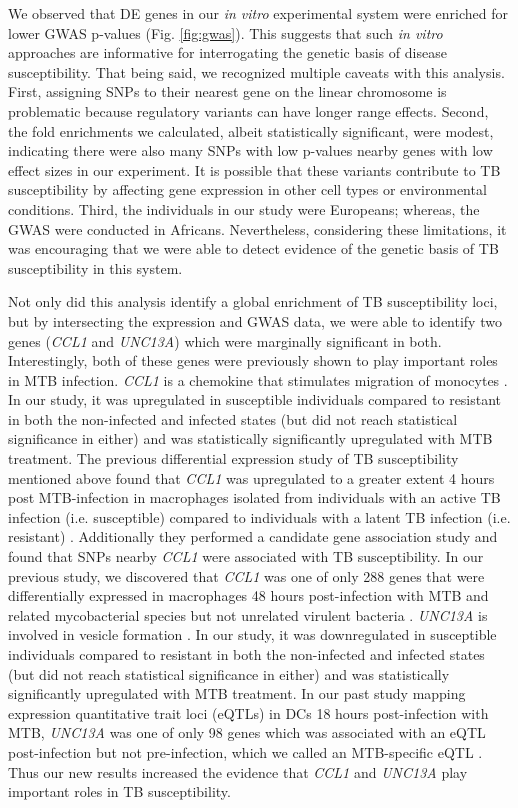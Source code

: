 \documentclass[fleqn,10pt]{wlscirep}
\begin{document}
We observed that DE genes in our \emph{in vitro} experimental system
were enriched for lower GWAS p-values (Fig. \ref{fig:gwas}). This
suggests that such \emph{in vitro} approaches are informative for
interrogating the genetic basis of disease susceptibility. That being
said, we recognized multiple caveats with this analysis. First,
assigning SNPs to their nearest gene on the linear chromosome is
problematic because regulatory variants can have longer range effects.
Second, the fold enrichments we calculated, albeit statistically
significant, were modest, indicating there were also many SNPs with
low p-values nearby genes with low effect sizes in our experiment. It
is possible that these variants contribute to TB susceptibility by
affecting gene expression in other cell types or environmental
conditions. Third, the individuals in our study were Europeans;
whereas, the GWAS were conducted in Africans. Nevertheless,
considering these limitations, it was encouraging that we were able to
detect evidence of the genetic basis of TB susceptibility in this
system.

Not only did this analysis identify a global enrichment of TB
susceptibility loci, but by intersecting the expression and GWAS data,
we were able to identify two genes (\emph{CCL1} and \emph{UNC13A})
which were marginally significant in both. Interestingly, both of
these genes were previously shown to play important roles in MTB
infection. \emph{CCL1} is a chemokine that stimulates migration of
monocytes \cite{Miller1992}. In our study, it was upregulated in
susceptible individuals compared to resistant in both the non-infected
and infected states (but did not reach statistical significance in
either) and was statistically significantly upregulated with MTB
treatment. The previous differential expression study of TB
susceptibility mentioned above found that \emph{CCL1} was upregulated
to a greater extent 4 hours post MTB-infection in macrophages isolated
from individuals with an active TB infection (i.e. susceptible)
compared to individuals with a latent TB infection (i.e. resistant)
\cite{Thuong2008}. Additionally they performed a candidate gene
association study and found that SNPs nearby \emph{CCL1} were
associated with TB susceptibility. In our previous study, we
discovered that \emph{CCL1} was one of only 288 genes that were
differentially expressed in macrophages 48 hours post-infection with
MTB and related mycobacterial species but not unrelated virulent
bacteria \cite{Blischak2015}. \emph{UNC13A} is involved in vesicle
formation \cite{Sudhof2004}. In our study, it was downregulated in
susceptible individuals compared to resistant in both the non-infected
and infected states (but did not reach statistical significance in
either) and was statistically significantly upregulated with MTB
treatment. In our past study mapping expression quantitative trait
loci (eQTLs) in DCs 18 hours post-infection with MTB, \emph{UNC13A}
was one of only 98 genes which was associated with an eQTL
post-infection but not pre-infection, which we called an MTB-specific
eQTL \cite{Barreiro2012}. Thus our new results increased the evidence
that \emph{CCL1} and \emph{UNC13A} play important roles in TB
susceptibility.
\end{document}
